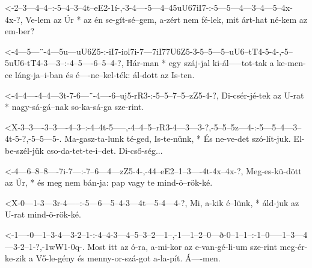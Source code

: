   {<-2--3---4--4--:-5--4--3--4t--eE2-1í-,-3-4----5---4--45uU67iI7-:-5---5---4---3--4---5--4x-4x-?,}
  {  Ve-lem az Úr * az én se-gít-sé--gem, a-zért nem fé-lek,        mit árt-hat né-kem az em-ber?}

  {<-4---5---¨-4---5u---uU6Z5-:-iI7-iol7i-7---7iI77U6Z5-3-5--5---5--uU6--tT4-5-4-,-5--5uU6-tT4-3---3--:-4--5----6--5--4-?,}
  {  Hár-man * egy száj-jal     ki-ál-----tot-tak       a ke-men-ce láng-ja--i-ban és é----ne--kel-ték: ál-dott az Is-ten.}

  {<-4--4----4--4---3t-7-6---¨-4----6--uj5-rR3-:-5--5--7--5--zZ5-4-?,}
  {  Di-csér-jé-tek az U-rat * nagy-sá-gá--nak   so-ka-sá-ga sze-rint.}

  {<X-3--3----3--3----4--3--:-4--4t-5-----,-4--4--5--rR3-4---3---3-?,-5--5--5z---4-:-5---5--4---3--4t-5-?,-5--5---5-.}
  {   Ma-gasz-ta-lunk té-ged, Is-te-nünk, * És ne-ve-det szó-lít-juk. El-be-szél-jük cso-da-tet-te-i--det. Di-cső-ség...}


  {<-4---6--8--8----7i-7---:-7--6---4---zZ5-4-,-44--eE2--1--3----4t-4x--4x-?,}
  {  Meg-es-kü-dött az Úr, * és meg nem bán-ja: pap vagy te mind-ö--rök-ké.}

  {<X-0---1-3---3r-4-----:-5---6---5--4-3---4t---5-4---4-?,}
  {   Mi, a-kik é--lünk, * áld-juk az U-rat mind-ö-rök-ké.}



  {<-1----0---1--3-4---3-2--1-:-4--4-3---4--5--3--2---1--,-1---1--2--0---ð-0--1--1--:-1--0-----1--3---4---3-2--1-?,-1wW1-0q-.}
  {  Most itt az ó-ra, a-mi-kor az e-van-gé-li-um sze-rint meg-ér-ke-zik a Vő-le-gény és menny-or-szá-got a-la-pít. Á----men.}

